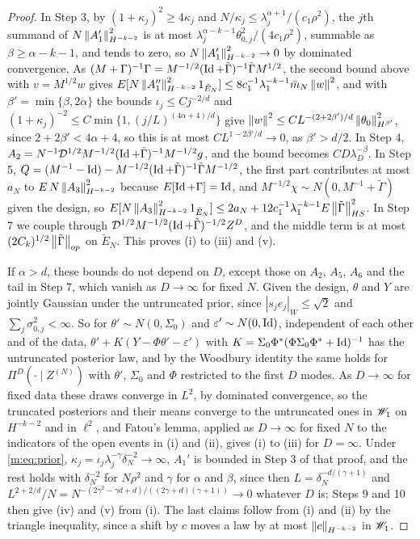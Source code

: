 \begin{proof}
In Step 3, by $(1+\kappa_j)^2\ge4\kappa_j$ and $N/\kappa_j\le\lambda_j^{\alpha+1}/(c_1\rho^2)$, the $j$th summand of $N\left\|A_1'\right\|^2_{H^{-k-2}}$ is at most $\lambda_j^{\alpha-k-1}\theta^2_{0,j}/(4c_1\rho^2)$, summable as $\beta\ge\alpha-k-1$, and tends to zero, so $N\left\|A_1'\right\|^2_{H^{-k-2}}\to0$ by dominated convergence. As $(M+\Gamma)^{-1}\Gamma=M^{-1/2}(\operatorname{Id}+\tilde\Gamma)^{-1}\tilde\Gamma M^{1/2}$, the second bound above with $v=M^{1/2}w$ gives $E[N\left\|A_1''\right\|^2_{H^{-k-2}}1_{\tilde E_N}]\le8c_1^{-1}\lambda_1^{-k-1}\bar m_N\left\|w\right\|^2$, and with $\beta'=\min\{\beta,2\alpha\}$ the bounds $\iota_j\le Cj^{-2/d}$ and $(1+\kappa_j)^{-2}\le C\min\{1,(j/L)^{(4\alpha+4)/d}\}$ give $\left\|w\right\|^2\le CL^{-(2+2\beta')/d}\left\|\theta_0\right\|^2_{H^{\beta'}}$, since $2+2\beta'<4\alpha+4$, so this is at most $CL^{1-2\beta'/d}\to0$, as $\beta'>d/2$. In Step 4, $A_2=N^{-1}\mathcal D^{1/2}M^{-1/2}(\operatorname{Id}+\tilde\Gamma)^{-1}M^{-1/2}g$, and the bound becomes $CD\lambda_D^{-\beta}$. In Step 5, $Q=(M^{-1}-\operatorname{Id})-M^{-1/2}(\operatorname{Id}+\tilde\Gamma)^{-1}\tilde\Gamma M^{-1/2}$, the first part contributes at most $a_N$ to $E\,N\left\|A_3\right\|^2_{H^{-k-2}}$ because $E[\operatorname{Id}+\Gamma]=\operatorname{Id}$, and $M^{-1/2}\chi\sim N(0,M^{-1}+\tilde\Gamma)$ given the design, so $E[N\left\|A_3\right\|^2_{H^{-k-2}}1_{\tilde E_N}]\le2a_N+12c_1^{-1}\lambda_1^{-k-1}E\left\|\tilde\Gamma\right\|^2_{HS}$. In Step 7 we couple through $\mathcal D^{1/2}M^{-1/2}(\operatorname{Id}+\tilde\Gamma)^{-1/2}Z^D$, and the middle term is at most $(2C_k)^{1/2}\left\|\tilde\Gamma\right\|_{op}$ on $\tilde E_N$. This proves (i) to (iii) and (v).

If $\alpha>d$, these bounds do not depend on $D$, except those on $A_2$, $A_5$, $A_6$ and the tail in Step 7, which vanish as $D\to\infty$ for fixed $N$. Given the design, $\theta$ and $Y$ are jointly Gaussian under the untruncated prior, since $|s_je_j|_W\le\sqrt2$ and $\sum_j\sigma^2_{0,j}<\infty$. So for $\theta'\sim N(0,\Sigma_0)$ and $\varepsilon'\sim N(0,\operatorname{Id})$, independent of each other and of the data, $\theta'+K(Y-\Phi\theta'-\varepsilon')$ with $K=\Sigma_0\Phi^*(\Phi\Sigma_0\Phi^*+\operatorname{Id})^{-1}$ has the untruncated posterior law, and by the Woodbury identity the same holds for $\Pi^D(\cdot\mid Z^{(N)})$ with $\theta'$, $\Sigma_0$ and $\Phi$ restricted to the first $D$ modes. As $D\to\infty$ for fixed data these draws converge in $L^2$, by dominated convergence, so the truncated posteriors and their means converge to the untruncated ones in $\mathscr{W}_1$ on $H^{-k-2}$ and in $\ell^2$, and Fatou's lemma, applied as $D\to\infty$ for fixed $N$ to the indicators of the open events in (i) and (ii), gives (i) to (iii) for $D=\infty$. Under \eqref{m:eq:prior}, $\kappa_j=\iota_j\lambda_j^{-\gamma}\delta_N^{-2}\to\infty$, $A_1'$ is bounded in Step 3 of that proof, and the rest holds with $\delta_N^{-2}$ for $N\rho^2$ and $\gamma$ for $\alpha$ and $\beta$, since then $L=\delta_N^{-d/(\gamma+1)}$ and $L^{2+2/d}/N=N^{-(2\gamma^2-\gamma d+d)/((2\gamma+d)(\gamma+1))}\to0$ whatever $D$ is; Steps 9 and 10 then give (iv) and (v) from (i). The last claims follow from (i) and (ii) by the triangle inequality, since a shift by $c$ moves a law by at most $\left\|c\right\|_{H^{-k-2}}$ in $\mathscr{W}_1$.
\end{proof}

